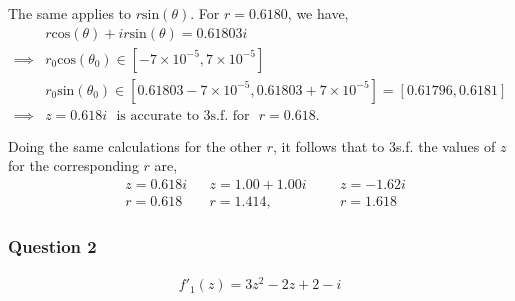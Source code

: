 \documentclass[12pt, a4paper]{article}
\begin{document}
The same applies to  $r\text{sin}(\theta)$. For $r = 0.6180$, we have,
\begin{align*}
	& r\text{cos}(\theta) + ir\text{sin}(\theta) = 0.61803i \\
	\implies & r_{0}\text{cos}(\theta_{0}) \in [-7\times10^{-5}, 7\times10^{-5}] \\
	& r_{0}\text{sin}(\theta_{0}) \in [0.61803-7\times10^{-5}, 0.61803+7\times10^{-5}] = [0.61796, 0.6181] \\
	\implies & z = 0.618i \text{~ is accurate to 3s.f. for ~} r = 0.618.
\end{align*}

Doing the same calculations for the other $r$, it follows that to 3s.f. the values of $z$ for the corresponding $r$ are,
\begin{align}
	& z =  0.618i && z = 1.00 + 1.00i &&& z = -1.62i\nonumber\\
	& r = 0.618 && r = 1.414, &&& r = 1.618 ~~ \nonumber 
\end{align}


\subsubsection*{Question 2}

\begin{align}
	f'_{1}(z) = 3z^{2}-2z+2-i\nonumber
\end{align}
\end{document}

